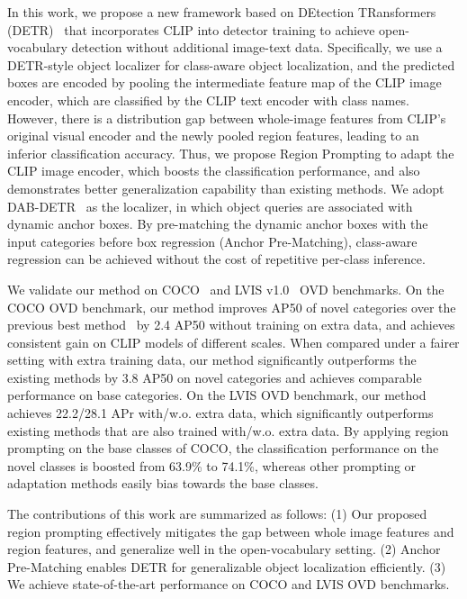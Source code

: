 \documentclass[10pt,twocolumn,letterpaper]{article}
\begin{document}
In this work, we propose a new framework based on DEtection TRansformers (DETR)~\cite{DETR} that incorporates CLIP into detector training to achieve open-vocabulary detection without additional image-text data.
Specifically, we use a DETR-style object localizer for class-aware object localization, and the predicted boxes are encoded by pooling the intermediate feature map of the CLIP image encoder, which are classified by the CLIP text encoder with class names.
However, there is a distribution gap between whole-image features from CLIP's original visual encoder and the newly pooled region features, leading to an inferior classification accuracy.
Thus, we propose Region Prompting to adapt the CLIP image encoder, which boosts the classification performance, and also demonstrates better generalization capability than existing methods.
We adopt DAB-DETR~\cite{dabdetr} as the localizer, in which object queries are associated with dynamic anchor boxes. 
By pre-matching the dynamic anchor boxes with the input categories before box regression (Anchor Pre-Matching), class-aware regression can be achieved without the cost of repetitive per-class inference.

We validate our method on COCO~\cite{COCO} and LVIS v1.0~\cite{LVIS} OVD benchmarks.
On the COCO OVD benchmark, our method improves AP50 of novel categories over the previous best method~\cite{regionclip} by 2.4 AP50 without training on extra data, and achieves consistent gain on CLIP models of different scales.
When compared under a fairer setting with extra training data, our method significantly outperforms the existing methods by 3.8 AP50 on novel categories and achieves comparable performance on base categories.
On the LVIS OVD benchmark, our method achieves 22.2/28.1 APr with/w.o. extra data, which significantly outperforms existing methods that are also trained with/w.o. extra data.
By applying region prompting on the base classes of COCO, the classification performance on the novel classes is boosted from 63.9\% to 74.1\%, whereas other prompting or adaptation methods easily bias towards the base classes.

The contributions of this work are summarized as follows:
(1) Our proposed region prompting effectively mitigates the gap between whole image features and region features, and generalize well in the open-vocabulary setting.
(2) Anchor Pre-Matching enables DETR for generalizable object localization efficiently.
(3) We achieve state-of-the-art performance on COCO and LVIS OVD benchmarks.
\end{document}
